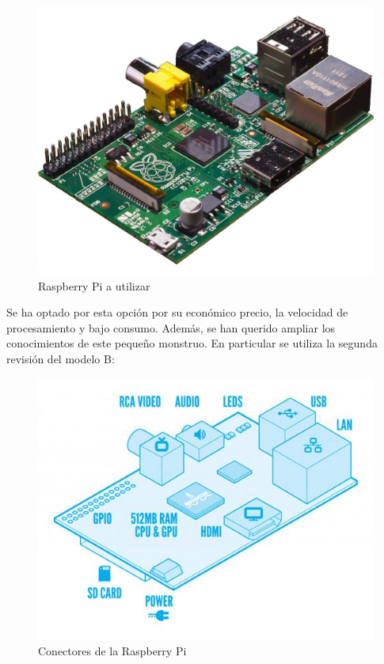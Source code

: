 \documentclass[twoside,11pt]{book}
\begin{document}
\begin{figure}[h!]
\begin{center}
\includegraphics[scale=0.1,bb=0 0 1280 1024]{images/RPi.png}
\caption{Raspberry Pi a utilizar}
\label{RPiImage}
\end{center}
\end{figure}

Se ha optado por esta opción por su económico precio, la velocidad de procesamiento y bajo consumo. Además, se han querido ampliar los conocimientos de este pequeño monstruo. En particular se utiliza la segunda revisión del modelo B:

\begin{figure}[h!]
\begin{center}
\includegraphics[scale=0.3,bb=0 0 512 399]{images/RPi2.png}
\caption{Conectores de la Raspberry Pi}
\label{RPiConn}
\end{center}
\end{figure}
\end{document}
